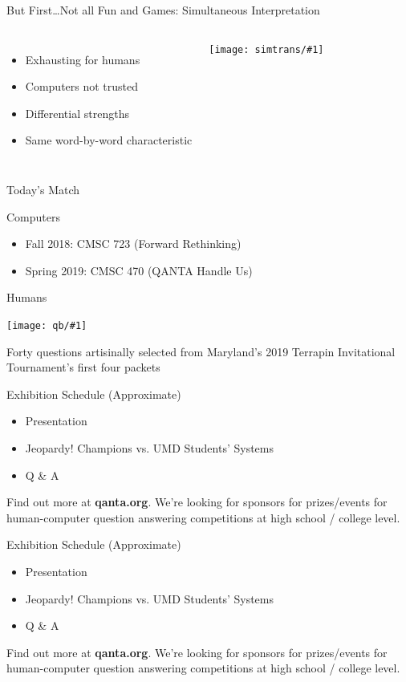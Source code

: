 \documentclass[xcolor=dvipsnames]{beamer}
\newcommand{\schedule}[0]{
\begin{frame}{Exhibition Schedule (Approximate)}

  \begin{itemize}
     \item[17:00] Presentation
     \item[17:20] Jeopardy! Champions vs. UMD Students' Systems
     \item[18:00] Q \& A
  \end{itemize}

  Find out more at {\bf qanta.org}.  We're looking for sponsors for
  prizes/events for human-computer question answering competitions at high school /
  college level.

\end{frame}
}
\newcommand{\gfxs}[2]{
\begin{center}
	\texttt{[image: simtrans/\#1]}
\end{center}
}
\newcommand{\gfxq}[2]{
\begin{center}
	\texttt{[image: qb/\#1]}
\end{center}
}
\begin{document}
\begin{frame}{But First\dots Not all Fun and Games: Simultaneous Interpretation}

  \begin{columns}
  \begin{itemize}
    \item Exhausting for humans
    \item Computers not trusted
    \item Differential strengths
    \item Same word-by-word characteristic
  \end{itemize}

 \gfxs{computer-interpreter}{1.0}
 \end{columns}
\end{frame}

\begin{frame}{Today's Match}

  \begin{block}{Computers}
    \begin{itemize}
    \item Fall 2018: CMSC 723 (Forward Rethinking)
    \item Spring 2019: CMSC 470 (QANTA
      Handle Us)
    \end{itemize}
  \end{block}

  \begin{block}{Humans}
    \gfxq{2019_may_expo}{.8}
  \end{block}

  Forty questions artisinally selected from Maryland's 2019 Terrapin
  Invitational Tournament's first four packets
  
\end{frame}

\schedule{}




\schedule{}


\end{document}
